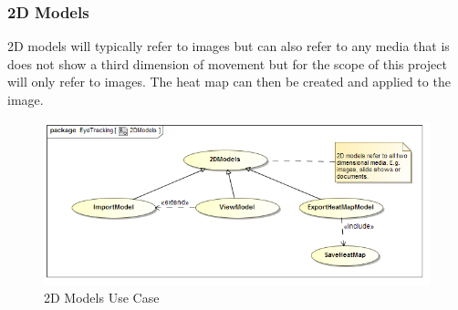 	\subsubsection{2D Models}
	2D models will typically refer to images but can also refer to any media that is does not show a third dimension of movement but for the scope of this project will only refer to images. The heat map can then be created and applied to the image.
	\newline
	\begin{figure}[!ht]
		\centering
		\includegraphics[scale=0.5]{Diagrams/Use_Case_Diagram__2DModels.png}
		\caption{2D Models Use Case}
	\end{figure}
